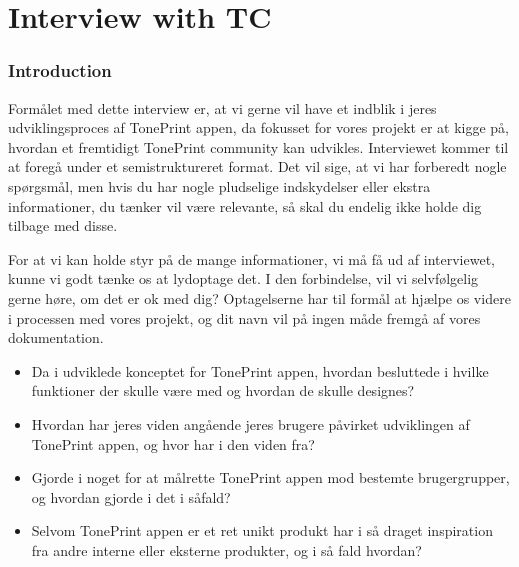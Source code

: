 \section{Interview with TC}
\label{InterviewInputs}

\subsubsection{Introduction}
Formålet med dette interview er, at vi gerne vil have et indblik i jeres udviklingsproces af TonePrint appen, da fokusset for vores projekt er at kigge på, hvordan et fremtidigt TonePrint community kan udvikles. Interviewet kommer til at foregå under et semistruktureret format. Det vil sige, at vi har forberedt nogle spørgsmål, men hvis du har nogle pludselige indskydelser eller ekstra informationer, du tænker vil være relevante, så skal du endelig ikke holde dig tilbage med disse.

For at vi kan holde styr på de mange informationer, vi må få ud af interviewet, kunne vi godt tænke os at lydoptage det. I den forbindelse, vil vi selvfølgelig gerne høre, om det er ok med dig? Optagelserne har til formål at hjælpe os videre i processen med vores projekt, og dit navn vil på ingen måde fremgå af vores dokumentation.

\begin{itemize}
  \item Da i udviklede konceptet for TonePrint appen, hvordan besluttede i hvilke funktioner der skulle være med og hvordan de skulle designes?\\
  \item Hvordan har jeres viden angående jeres brugere påvirket udviklingen af TonePrint appen, og hvor har i den viden fra?\\
  \item Gjorde i noget for at målrette TonePrint appen mod bestemte brugergrupper, og hvordan gjorde i det i såfald?\\
  \item Selvom TonePrint appen er et ret unikt produkt har i så draget inspiration fra andre interne eller eksterne produkter, og i så fald hvordan?\\
\end{itemize}

